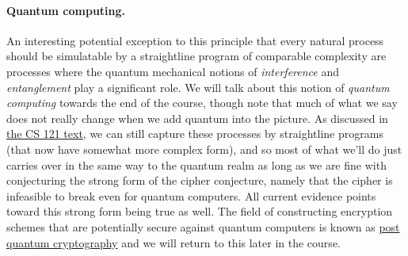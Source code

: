 \paragraph{Quantum computing.} An interesting potential exception to
this principle that every natural process should be simulatable by a
straightline program of comparable complexity are processes where the
quantum mechanical notions of \emph{interference} and
\emph{entanglement} play a significant role. We will talk about this
notion of \emph{quantum computing} towards the end of the course, though
note that much of what we say does not really change when we add quantum
into the picture. As discussed in
\href{https://introtcs.org/public/lec_26_quantum_computing.html}{the CS
121 text}, we can still capture these processes by straightline programs
(that now have somewhat more complex form), and so most of what we'll do
just carries over in the same way to the quantum realm as long as we are
fine with conjecturing the strong form of the cipher conjecture, namely
that the cipher is infeasible to break even for quantum computers. All
current evidence points toward this strong form being true as well. The
field of constructing encryption schemes that are potentially secure
against quantum computers is known as
\href{https://en.wikipedia.org/wiki/Post-quantum_cryptography}{post
quantum cryptography} and we will return to this later in the course.

